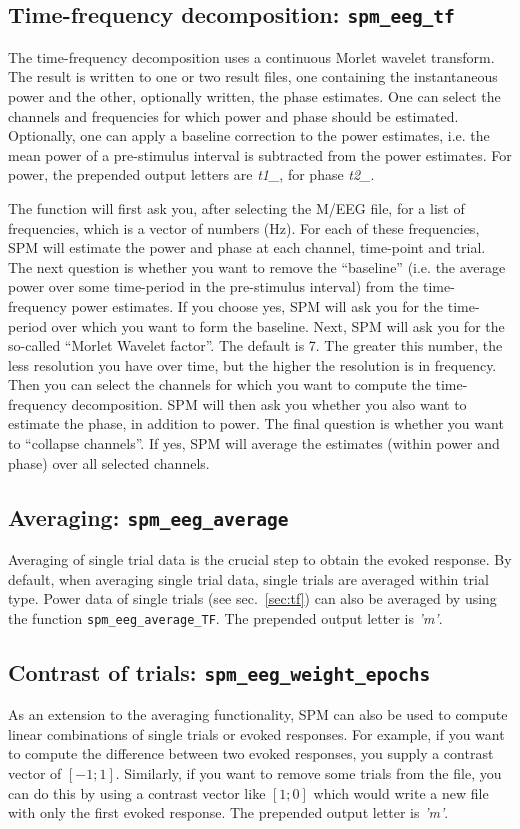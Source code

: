 \subsection{Time-frequency decomposition: \texttt{spm\_eeg\_tf}\label{sec:tf}}
The time-frequency decomposition uses a continuous Morlet wavelet transform. The result is written to one or two result files, one containing the instantaneous power and the other, optionally written, the phase estimates. One can select the channels and frequencies for which power and phase should be estimated. Optionally, one can apply a baseline correction to the power estimates, i.e. the mean power of a pre-stimulus interval is subtracted from the power estimates. For power, the prepended output letters are \textit{t1\_}, for phase \textit{t2\_}.

The function will first ask you, after selecting the M/EEG file, for a list of frequencies, which is a vector of numbers (Hz).  For each of these frequencies, SPM will estimate the power and phase at each channel, time-point and trial. The next question is whether you want to remove the ``baseline'' (i.e. the average power over some time-period in the pre-stimulus interval) from the time-frequency power estimates. If you choose yes, SPM will ask you for the time-period over which you want to form the baseline. Next, SPM will ask you for the so-called ``Morlet Wavelet factor''. The default is 7. The greater this number, the less resolution you  have over time, but the higher the resolution is in frequency. Then you can select the channels for which you want to compute the time-frequency decomposition. SPM will then ask you whether you also want to estimate the phase, in addition to power. The final question is whether you want to ``collapse channels''. If yes, SPM will average the estimates (within power and phase) over all selected channels.

\subsection{Averaging: \texttt{spm\_eeg\_average}}
Averaging of single trial data is the crucial step to obtain the evoked response. By default, when averaging single trial data, single trials are averaged within trial type. Power data of single trials (see sec.~\ref{sec:tf}) can also be averaged by using the function \texttt{spm\_eeg\_average\_TF}. The prepended output letter is \textit{'m'}.


\subsection{Contrast of trials: \texttt{spm\_eeg\_weight\_epochs}}
As an extension to the averaging functionality, SPM can also be used to compute linear combinations of single trials or evoked responses. For example, if you want to compute the difference between two evoked responses, you supply a contrast vector of $[-1; 1]$. Similarly, if you want to remove some trials from the file, you can do this by using a contrast vector like $[1; 0]$ which would write a new file with only the first evoked response. The prepended output letter is \textit{'m'}.

